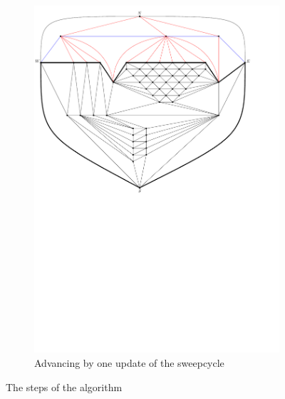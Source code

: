 \begin{figure}
\begin{subfigure}[b]{.9 \textwidth}
      \label{fig:ex:vert:sweep1}
    \end{subfigure}
    ~
    \begin{subfigure}[b]{.9 \textwidth}
      \includegraphics[width=\textwidth]{examples/img/vertWorstCase/sweep2}
      \caption{Advancing by one update of the sweepcycle}
      \label{fig:ex:vert:sweep2}
    \end{subfigure}
    \label{fig:ex:vert}
    \caption{The steps of the algorithm}
\end{figure}

